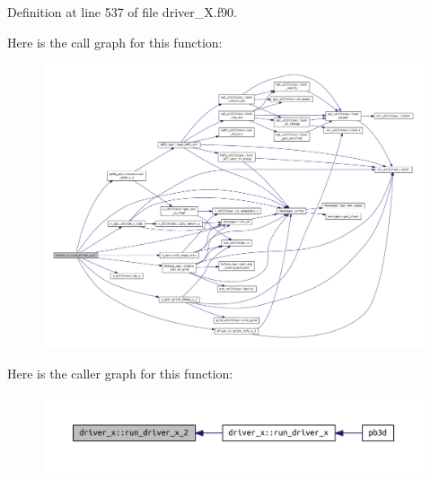 Definition at line 537 of file driver\+\_\+\+X.\+f90.

Here is the call graph for this function\+:\nopagebreak
\begin{figure}[H]
\begin{center}
\leavevmode
\includegraphics[width=350pt]{namespacedriver__x_ad3924b3d66f336f0a9a9559eafffec8e_cgraph}
\end{center}
\end{figure}
Here is the caller graph for this function\+:\nopagebreak
\begin{figure}[H]
\begin{center}
\leavevmode
\includegraphics[width=350pt]{namespacedriver__x_ad3924b3d66f336f0a9a9559eafffec8e_icgraph}
\end{center}
\end{figure}
